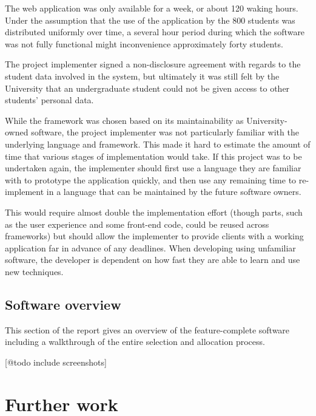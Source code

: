 \documentclass[draft]{scrartcl}
\let\stdsection\section
\renewcommand\section{\clearpage\stdsection}
\begin{document}
The web application was only available for a week, or about 120 waking hours.
Under the assumption that the use of the application by the 800 students was
distributed uniformly over time, a several hour period during which the
software was not fully functional might inconvenience approximately forty
students.

The project implementer signed a non-disclosure agreement with regards to the
student data involved in the system, but ultimately it was still felt by the
University that an undergraduate student could not be given access to other
students' personal data.


While the framework was chosen based on its maintainability as
University-owned software, the project implementer was not particularly
familiar with the underlying language and framework. This made it hard to
estimate the amount of time that various stages of implementation would take.
If this project was to be undertaken again, the implementer should first use a
language they are familiar with to prototype the application quickly, and then
use any remaining time to re-implement in a language that can be maintained by
the future software owners.

This would require almost double the implementation effort (though parts, such
as the user experience and some front-end code, could be reused across
frameworks) but should allow the implementer to provide clients with a working
application far in advance of any deadlines. When developing using unfamiliar
software, the developer is dependent on how fast they are able to learn and
use new techniques.



\subsection{Software overview}

This section of the report gives an overview of the feature-complete software
including a walkthrough of the entire selection and allocation process.

[@todo include screenshots]



\section{Further work}
\label{sec:furtherwork}
\end{document}
